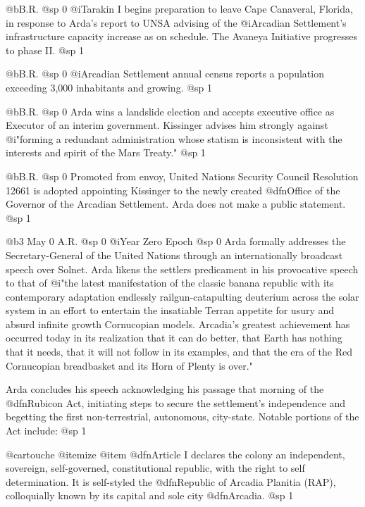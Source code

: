 @b{B.R.}
@sp 0
@i{Tarakin I} begins preparation to leave Cape Canaveral, Florida, in response to Arda's report to UNSA advising of the @i{Arcadian Settlement's} infrastructure capacity increase as on schedule. The Avaneya Initiative progresses to phase II.
@sp 1

@b{B.R.}
@sp 0
@i{Arcadian Settlement} annual census reports a population exceeding 3,000 inhabitants and growing.
@sp 1

@b{B.R.}
@sp 0
Arda wins a landslide election and accepts executive office as Executor of an interim government. Kissinger advises him strongly against @i{"forming a redundant administration whose statism is inconsistent with the interests and spirit of the Mars Treaty."}
@sp 1

@b{B.R.}
@sp 0
Promoted from envoy, United Nations Security Council Resolution 12661 is adopted appointing Kissinger to the newly created @dfn{Office of the Governor of the Arcadian Settlement}. Arda does not make a public statement.
@sp 1

@b{3 May 0 A.R.}
@sp 0
@i{Year Zero Epoch}
@sp 0
Arda formally addresses the Secretary-General of the United Nations through an internationally broadcast speech over Solnet. Arda likens the settlers predicament in his provocative speech to that of @i{"the latest manifestation of the classic banana republic with its contemporary adaptation endlessly railgun-catapulting deuterium across the solar system in an effort to entertain the insatiable Terran appetite for usury and absurd infinite growth Cornucopian models. Arcadia's greatest achievement has occurred today in its realization that it can do better, that Earth has nothing that it needs, that it will not follow in its examples, and that the era of the Red Cornucopian breadbasket and its Horn of Plenty is over."}

Arda concludes his speech acknowledging his passage that morning of the @dfn{Rubicon Act}, initiating steps to secure the settlement's independence and begetting the first non-terrestrial, autonomous, city-state. Notable portions of the Act include:
@sp 1

@cartouche
@itemize
@item
@dfn{Article I} declares the colony an independent, sovereign, self-governed, constitutional republic, with the right to self determination. It is self-styled the @dfn{Republic of Arcadia Planitia (RAP)}, colloquially known by its capital and sole city @dfn{Arcadia}.
@sp 1

